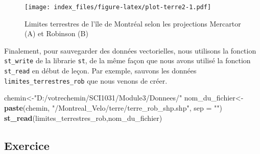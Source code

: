 \documentclass[]{article}
\newenvironment{Shaded}{\begin{snugshade}}{\end{snugshade}}
\newcommand{\KeywordTok}[1]{\textcolor[rgb]{0.13,0.29,0.53}{\textbf{#1}}}
\newcommand{\DataTypeTok}[1]{\textcolor[rgb]{0.13,0.29,0.53}{#1}}
\newcommand{\StringTok}[1]{\textcolor[rgb]{0.31,0.60,0.02}{#1}}
\newcommand{\NormalTok}[1]{#1}
\begin{document}
\begin{figure}
\centering
\texttt{[image: index\_files/figure-latex/plot-terre2-1.pdf]}
\caption{Limites terrestres de l'île de Montréal selon les projections
Mercartor (A) et Robinson (B)}
\end{figure}

Finalement, pour sauvegarder des données vectorielles, nous utilisons la
fonction \texttt{st\_write} de la librarie \texttt{st}, de la même façon
que nous avons utilisé la fonction \texttt{st\_read} en début de leçon.
Par exemple, sauvons les données \texttt{limites\_terrestres\_rob} que
nous venons de créer.

\begin{Shaded}
\begin{Highlighting}[]
\NormalTok{chemin<-}\StringTok{"D:/votrechemin/SCI1031/Module3/Donnees/"}
\NormalTok{nom_du_fichier<-}\StringTok{ }\KeywordTok{paste}\NormalTok{(chemin, }\StringTok{"/Montreal_Velo/terre/terre_rob_shp.shp"}\NormalTok{, }\DataTypeTok{sep =} \StringTok{""}\NormalTok{)}
\KeywordTok{st_read}\NormalTok{(limites_terrestres_rob,nom_du_fichier)}
\end{Highlighting}
\end{Shaded}

\subsection{Exercice}\label{exercice}
\end{document}
